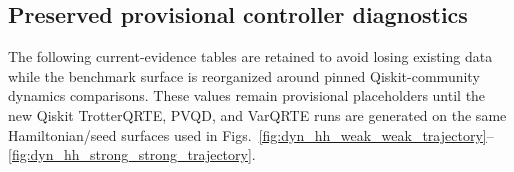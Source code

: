 
\subsection{Preserved provisional controller diagnostics}

The following current-evidence tables are retained to avoid losing existing data while the benchmark surface is reorganized around pinned Qiskit-community dynamics comparisons.  These values remain provisional placeholders until the new Qiskit TrotterQRTE, PVQD, and VarQRTE runs are generated on the same Hamiltonian/seed surfaces used in Figs.~\ref{fig:dyn_hh_weak_weak_trajectory}--\ref{fig:dyn_hh_strong_strong_trajectory}.


